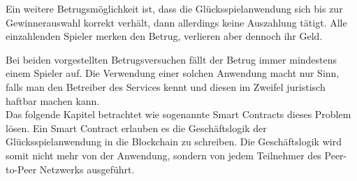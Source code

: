 Ein weitere Betrugsmöglichkeit ist, dass die Glücksspielanwendung sich bis zur Gewinnerauswahl korrekt verhält, dann allerdings keine Auszahlung tätigt. Alle einzahlenden Spieler merken den Betrug, verlieren aber dennoch ihr Geld.

Bei beiden vorgestellten Betrugsversuchen fällt der Betrug immer mindestens einem Spieler auf. Die Verwendung einer solchen Anwendung macht nur Sinn, falls man den Betreiber des Services kennt und diesen im Zweifel juristisch haftbar machen kann.\\
Das folgende Kapitel betrachtet wie sogenannte Smart Contracts dieses Problem lösen. Ein Smart Contract erlauben es die Geschäftslogik der Glücksspielanwendung in die Blockchain zu schreiben. Die Geschäftslogik wird somit nicht mehr von der Anwendung, sondern von jedem Teilnehmer des Peer-to-Peer Netzwerks ausgeführt.
